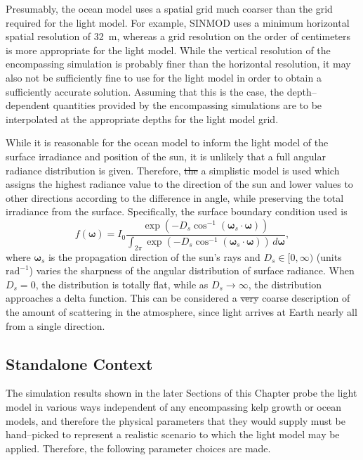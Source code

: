 \documentclass[ms,cpyr,lof,lot]{uathesis}
\renewcommand\vec\bm
\providecommand{\DIFdel}[1]{{\protect\color{red}\sout{#1}}}                      %
\providecommand{\DIFdelbegin}{} %
\providecommand{\DIFdelend}{} %
\newcommand{\DIFscaledelfig}{0.5}
\newlength{\DIFdelgraphicswidth} %
\newlength{\DIFdelgraphicsheight} %
\newcommand{\DIFdelincludegraphics}[2][]{%
\sbox{\DIFdelgraphicsbox}{\DIFOincludegraphics[#1]{#2}}%
\settoboxwidth{\DIFdelgraphicswidth}{\DIFdelgraphicsbox} %
\settoboxtotalheight{\DIFdelgraphicsheight}{\DIFdelgraphicsbox} %
\scalebox{\DIFscaledelfig}{%
\parbox[b]{\DIFdelgraphicswidth}{\usebox{\DIFdelgraphicsbox}\\[-\baselineskip] \rule{\DIFdelgraphicswidth}{0em}}\llap{\resizebox{\DIFdelgraphicswidth}{\DIFdelgraphicsheight}{%
\setlength{\unitlength}{\DIFdelgraphicswidth}%
\begin{picture}(1,1)%
\thicklines\linethickness{2pt} %
{\color[rgb]{1,0,0}\put(0,0){\framebox(1,1){}}}%
{\color[rgb]{1,0,0}\put(0,0){\line( 1,1){1}}}%
{\color[rgb]{1,0,0}\put(0,1){\line(1,-1){1}}}%
\end{picture}%
}\hspace*{3pt}}} %
} %
\DeclareRobustCommand{\DIFdelbegin}{\DIFOdelbegin \let\includegraphics\DIFdelincludegraphics} %
\DeclareRobustCommand{\DIFdelend}{\DIFOaddend \let\includegraphics\DIFOincludegraphics} %
\begin{document}
Presumably, the ocean model uses a spatial grid much coarser than the grid required for the light model.
For example, SINMOD \cite{wassmann_modelling_2006} uses a minimum horizontal spatial resolution of \SI{32}{\m}, whereas a grid resolution on the order of centimeters is more appropriate for the light model.
While the vertical resolution of the encompassing simulation is probably finer than the horizontal resolution, it may also not be sufficiently fine to use for the light model in order to obtain a sufficiently accurate solution.
Assuming that this is the case, the depth--dependent quantities provided by the encompassing simulations are to be interpolated at the appropriate depths for the light model grid.

While it is reasonable for the ocean model to inform the light model of the surface irradiance and position of the sun, it is unlikely that a full angular radiance distribution is given.
Therefore, \DIFdelbegin \DIFdel{the }\DIFdelend a simplistic model is used which assigns the highest radiance value to the direction of the sun and lower values to other directions according to the difference in angle, while preserving the total irradiance from the surface.
Specifically, the surface boundary condition used is
\begin{equation}
  f(\vec{\omega}) = I_0\frac{\exp\left( -D_s \cos^{-1}\left(\vec{\omega}_s \cdot \vec{\omega}\right) \right)}{\int_{2\pi}\exp\left( -D_s \cos^{-1}\left(\vec{\omega}_s \cdot \vec{\omega}\right) \right)\, d\vec{\omega}},
\end{equation} %
where $\vec{\omega}_s$ is the propagation direction of the sun's rays and $D_s\in[0, \infty)$ (units $\mbox{rad}^{-1}$) varies the sharpness of the angular distribution of surface radiance.
When $D_s=0$, the distribution is totally flat, while as $D_s \to \infty$, the distribution approaches a delta function.
This can be considered a \DIFdelbegin \DIFdel{very }\DIFdelend coarse description of the amount of scattering in the atmosphere, since light arrives at Earth nearly all from a single direction.

\subsection{Standalone Context}
\label{sec:standalone_context}
The simulation results shown in the later Sections of this Chapter probe the light model in various ways independent of any encompassing kelp growth or ocean models, and therefore the physical parameters that they would supply must be hand--picked to represent a realistic scenario to which the light model may be applied.
Therefore, the following parameter choices are made.
\end{document}
